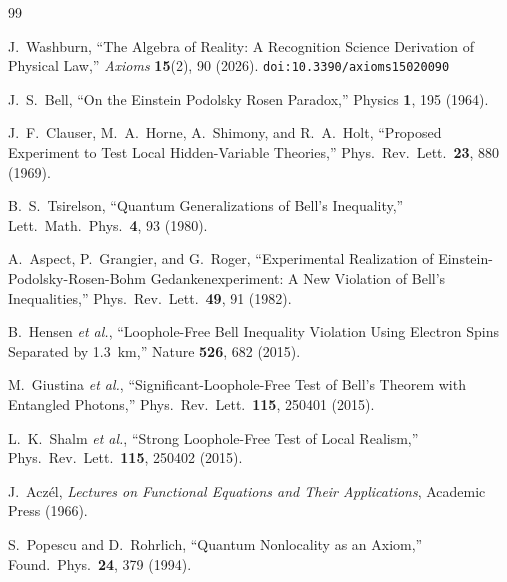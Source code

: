 \documentclass[12pt,a4paper]{article}
\theoremstyle{definition}
\theoremstyle{remark}
\begin{document}
\begin{thebibliography}{99}

J.~Washburn, ``The Algebra of Reality: A Recognition Science Derivation
of Physical Law,'' \emph{Axioms} \textbf{15}(2), 90 (2026).
\texttt{doi:10.3390/axioms15020090}

J.~S.~Bell, ``On the Einstein Podolsky Rosen Paradox,''
Physics \textbf{1}, 195 (1964).

J.~F.~Clauser, M.~A.~Horne, A.~Shimony, and R.~A.~Holt,
``Proposed Experiment to Test Local Hidden-Variable Theories,''
Phys.\ Rev.\ Lett.\ \textbf{23}, 880 (1969).

B.~S.~Tsirelson, ``Quantum Generalizations of Bell's
Inequality,'' Lett.\ Math.\ Phys.\ \textbf{4}, 93 (1980).

A.~Aspect, P.~Grangier, and G.~Roger,
``Experimental Realization of Einstein-Podolsky-Rosen-Bohm
Gedankenexperiment: A New Violation of Bell's Inequalities,''
Phys.\ Rev.\ Lett.\ \textbf{49}, 91 (1982).

B.~Hensen \textit{et al.}, ``Loophole-Free Bell Inequality
Violation Using Electron Spins Separated by 1.3~km,''
Nature \textbf{526}, 682 (2015).

M.~Giustina \textit{et al.}, ``Significant-Loophole-Free
Test of Bell's Theorem with Entangled Photons,''
Phys.\ Rev.\ Lett.\ \textbf{115}, 250401 (2015).

L.~K.~Shalm \textit{et al.}, ``Strong Loophole-Free Test
of Local Realism,'' Phys.\ Rev.\ Lett.\ \textbf{115},
250402 (2015).

J.~Acz\'el, \emph{Lectures on Functional Equations and Their
Applications}, Academic Press (1966).

S.~Popescu and D.~Rohrlich, ``Quantum Nonlocality as an Axiom,''
Found.\ Phys.\ \textbf{24}, 379 (1994).

\end{thebibliography}
\end{document}
